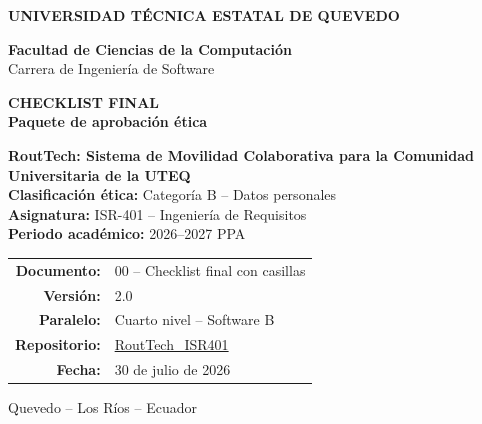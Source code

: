 \documentclass[10pt,a4paper]{article}
\newcommand{\Proyecto}{RoutTech: Sistema de Movilidad Colaborativa para la Comunidad Universitaria de la UTEQ}
\newcommand{\Asignatura}{ISR-401 -- Ingeniería de Requisitos}
\newcommand{\Periodo}{2026--2027 PPA}
\newcommand{\CategoriaEtica}{Categoría B -- Datos personales}
\newcommand{\Repositorio}{https://github.com/AnderJM3/RoutTech_ISR401}
\newcommand{\FechaDocumento}{30 de julio de 2026}
\newcommand{\VersionDocumento}{2.0}
\newcommand{\Paralelo}{Cuarto nivel -- Software B}
\begin{document}
\justifying

\thispagestyle{empty}

\vspace*{0.65cm}
\begin{center}
{\color{white}\Large\bfseries UNIVERSIDAD TÉCNICA ESTATAL DE QUEVEDO}

\vspace{1.75cm}
{\large\bfseries\color{RTForest} Facultad de Ciencias de la Computación\\[4pt]}
{\normalsize\color{RTGray} Carrera de Ingeniería de Software}

\vspace{0.9cm}

{\Huge\bfseries\color{RTForest} CHECKLIST FINAL\\[8pt]}
{\Large\bfseries\color{RTTerracotta} Paquete de aprobación ética}

\vspace{1.1cm}

\begin{tcolorbox}[width=0.90\textwidth,colback=RTCream,colframe=RTGold,boxrule=1pt,arc=2mm]
\centering
{\large\bfseries \Proyecto}\\[7pt]
\textbf{Clasificación ética:} \CategoriaEtica\\
\textbf{Asignatura:} \Asignatura\\
\textbf{Periodo académico:} \Periodo
\end{tcolorbox}

\vfill
\begin{tabular}{rl}
\textbf{Documento:} & 00 -- Checklist final con casillas\\
\textbf{Versión:} & \VersionDocumento\\
\textbf{Paralelo:} & \Paralelo\\
\textbf{Repositorio:} & \href{\Repositorio}{RoutTech\_ISR401}\\
\textbf{Fecha:} & \FechaDocumento
\end{tabular}

\vspace{0.8cm}
{\small Quevedo -- Los Ríos -- Ecuador}
\end{center}
\clearpage
\end{document}
